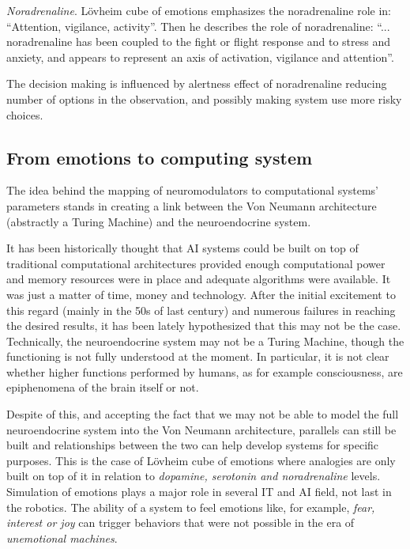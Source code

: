 \documentclass[procedia]{easychair}
\begin{document}
\textit{Noradrenaline}.  L{\"o}vheim cube of emotions emphasizes the noradrenaline role in: ``Attention,
vigilance, activity''. Then he describes the role of noradrenaline: ``... noradrenaline has been coupled to the fight or
flight response and to stress and anxiety, and appears to represent an axis of activation, vigilance and attention''.

The decision making is influenced by alertness effect of noradrenaline reducing number of options in the observation,
and possibly making system use more risky choices.


\subsection{From emotions to computing system}

The idea behind the mapping of neuromodulators to computational systems' parameters stands
in creating a link between the Von Neumann architecture (abstractly a Turing
Machine) and the neuroendocrine system.

It has been historically thought
that AI systems could be built on top of traditional computational architectures
provided enough computational power and memory resources were in place and adequate
algorithms were available. It was just a matter of time, money and technology. After the initial
excitement to this regard (mainly in the 50s of last century) and numerous
failures in reaching the desired results, it has been lately hypothesized that this may
not be the case. Technically, the neuroendocrine system may not be a Turing Machine,
though the functioning is not fully understood at the moment. In particular, it is not clear
whether higher functions performed by humans, as for example consciousness, are epiphenomena
of the brain itself or not.

Despite of this, and accepting the fact that we may not be able to model the full neuroendocrine
system into the Von Neumann architecture, parallels can still be built and relationships
between the two can help develop systems for specific purposes. This is the case of L{\"o}vheim cube of emotions
where analogies are only built on top of it
in relation to \textit{dopamine, serotonin and noradrenaline} levels. Simulation
of emotions plays a major role in several IT and AI field, not last in the robotics. The ability of a
system to feel emotions like, for example, \textit{fear, interest or joy} can
trigger behaviors that were not possible in the era of \textit{unemotional machines}.
\end{document}
